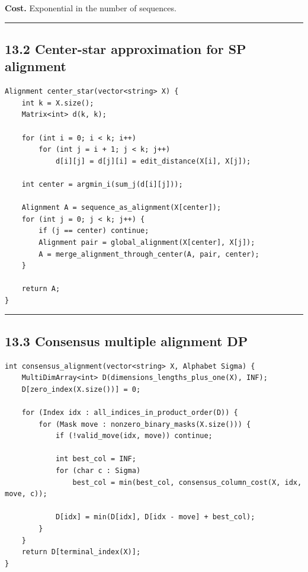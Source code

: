 \documentclass[11pt]{article}
\begin{document}
\textbf{Cost.} Exponential in the number of sequences.

\begin{center}\rule{0.5\linewidth}{0.5pt}\end{center}

\subsection{13.2 Center-star approximation for SP alignment}\label{center-star-approximation-for-sp-alignment}

\begin{verbatim}
Alignment center_star(vector<string> X) {
    int k = X.size();
    Matrix<int> d(k, k);

    for (int i = 0; i < k; i++)
        for (int j = i + 1; j < k; j++)
            d[i][j] = d[j][i] = edit_distance(X[i], X[j]);

    int center = argmin_i(sum_j(d[i][j]));

    Alignment A = sequence_as_alignment(X[center]);
    for (int j = 0; j < k; j++) {
        if (j == center) continue;
        Alignment pair = global_alignment(X[center], X[j]);
        A = merge_alignment_through_center(A, pair, center);
    }

    return A;
}
\end{verbatim}

\begin{center}\rule{0.5\linewidth}{0.5pt}\end{center}

\subsection{13.3 Consensus multiple alignment DP}\label{consensus-multiple-alignment-dp}

\begin{verbatim}
int consensus_alignment(vector<string> X, Alphabet Sigma) {
    MultiDimArray<int> D(dimensions_lengths_plus_one(X), INF);
    D[zero_index(X.size())] = 0;

    for (Index idx : all_indices_in_product_order(D)) {
        for (Mask move : nonzero_binary_masks(X.size())) {
            if (!valid_move(idx, move)) continue;

            int best_col = INF;
            for (char c : Sigma)
                best_col = min(best_col, consensus_column_cost(X, idx, move, c));

            D[idx] = min(D[idx], D[idx - move] + best_col);
        }
    }
    return D[terminal_index(X)];
}
\end{verbatim}
\end{document}
